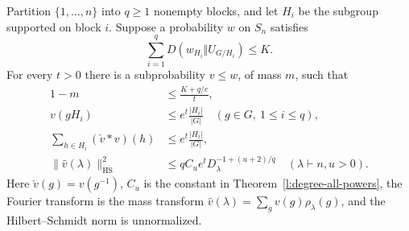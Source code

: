 \begin{theorem}
\label{l:replica-clipping}
Partition $\{1,\ldots,n\}$ into $q\ge1$ nonempty blocks, and let
$H_i$ be the subgroup supported on block $i$.  Suppose a probability
$w$ on $S_n$ satisfies
\begin{equation}\label{l:replica-entropy-assumption}
 \sum_{i=1}^qD(w_{H_i}\Vert U_{G/H_i})\le K.
\end{equation}
For every $t>0$ there is a subprobability $v\le w$, of mass $m$,
such that
\begin{align}
 1-m&\le\frac{K+q/e}{t},\label{l:replica-mass}\\
 v(gH_i)&\le e^t\frac{|H_i|}{|G|}\quad(g\in G,\ 1\le i\le q),
 \label{l:replica-cap}\\
 \sum_{h\in H_i}(\check v*v)(h)
 &\le e^t\frac{|H_i|}{|G|},\label{l:replica-collision}\\
 \|\widehat v(\lambda)\|_{\mathrm{HS}}^2
 &\le qC_u e^tD_\lambda^{-1+(u+2)/q}
        \quad(\lambda\vdash n, u>0).
 \label{l:replica-hs}
\end{align}
Here $\check v(g)=v(g^{-1})$, $C_u$ is the constant in
Theorem~\ref{l:degree-all-powers}, the Fourier transform is the mass
transform $\widehat v(\lambda)=\sum_gv(g)\rho_\lambda(g)$, and
the Hilbert--Schmidt norm is unnormalized.
\end{theorem}
